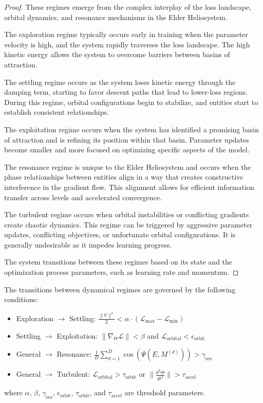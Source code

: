 \begin{proof}
These regimes emerge from the complex interplay of the loss landscape, orbital dynamics, and resonance mechanisms in the Elder Heliosystem.

The exploration regime typically occurs early in training when the parameter velocity is high, and the system rapidly traverses the loss landscape. The high kinetic energy allows the system to overcome barriers between basins of attraction.

The settling regime occurs as the system loses kinetic energy through the damping term, starting to favor descent paths that lead to lower-loss regions. During this regime, orbital configurations begin to stabilize, and entities start to establish consistent relationships.

The exploitation regime occurs when the system has identified a promising basin of attraction and is refining its position within that basin. Parameter updates become smaller and more focused on optimizing specific aspects of the model.

The resonance regime is unique to the Elder Heliosystem and occurs when the phase relationships between entities align in a way that creates constructive interference in the gradient flow. This alignment allows for efficient information transfer across levels and accelerated convergence.

The turbulent regime occurs when orbital instabilities or conflicting gradients create chaotic dynamics. This regime can be triggered by aggressive parameter updates, conflicting objectives, or unfortunate orbital configurations. It is generally undesirable as it impedes learning progress.

The system transitions between these regimes based on its state and the optimization process parameters, such as learning rate and momentum.
\end{proof}

\begin{theorem}
The transitions between dynamical regimes are governed by the following conditions:
\begin{itemize}
    \item Exploration $\to$ Settling: $\frac{\|V\|^2}{2} < \alpha \cdot (\mathcal{L}_{\max} - \mathcal{L}_{\min})$
    \item Settling $\to$ Exploitation: $\|\nabla_{\Theta} \mathcal{L}\| < \beta$ and $\mathcal{L}_{\text{orbital}} < \epsilon_{\text{orbit}}$
    \item General $\to$ Resonance: $\frac{1}{D} \sum_{d=1}^D \cos(\Psi(E, M^{(d)})) > \gamma_{\text{res}}$
    \item General $\to$ Turbulent: $\mathcal{L}_{\text{orbital}} > \tau_{\text{orbit}}$ or $\|\frac{d^2\Theta}{dt^2}\| > \tau_{\text{accel}}$
\end{itemize}

where $\alpha$, $\beta$, $\gamma_{\text{res}}$, $\epsilon_{\text{orbit}}$, $\tau_{\text{orbit}}$, and $\tau_{\text{accel}}$ are threshold parameters.
\end{theorem}

